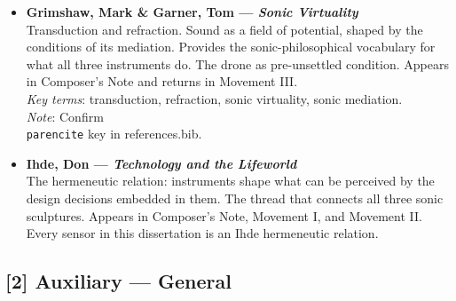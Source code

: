 \begin{itemize}
    \item \textbf{Grimshaw, Mark \& Garner, Tom — \textit{Sonic Virtuality}}\\
    Transduction and refraction. Sound as a field of potential, shaped by the conditions of its mediation. Provides the sonic-philosophical vocabulary for what all three instruments do. The drone as pre-unsettled condition. Appears in Composer's Note and returns in Movement III.\\
    \textit{Key terms}: transduction, refraction, sonic virtuality, sonic mediation.\\
    \textit{Note}: Confirm \texttt{\\parencite} key in references.bib.

    \item \textbf{Ihde, Don — \textit{Technology and the Lifeworld}} \parencite{Ihde_1990}\\
    The hermeneutic relation: instruments shape what can be perceived by the design decisions embedded in them. The thread that connects all three sonic sculptures. Appears in Composer's Note, Movement I, and Movement II. Every sensor in this dissertation is an Ihde hermeneutic relation.

\end{itemize}

\subsection*{[2] Auxiliary — General}

